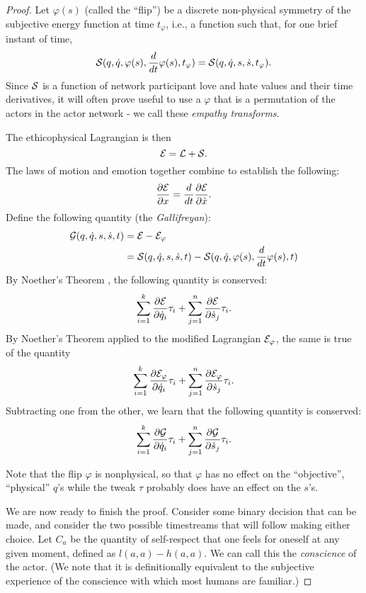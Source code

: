 \documentclass{article}
\begin{document}
\begin{proof}
  Let $\varphi(s)$ (called the ``flip'') be a discrete non-physical
  symmetry of the subjective energy function at time $t_{\varphi}$,
  i.e., a function such that, for one brief instant of time,
  $${\mathcal S}(q, \dot{q}, \varphi(s), \frac{d}{dt} \varphi(s), t_{\varphi})
  = {\mathcal S}(q, \dot{q}, s, \dot{s}, t_{\varphi}).$$ Since ${\mathcal S}$ is a
  function of network participant love and hate values and their time
  derivatives, it will often prove useful to use a $\varphi$ that is a
  permutation of the actors in the actor network - we call these {\em
    empathy transforms}.

  The ethicophysical Lagrangian is then
  $${\mathcal E} = {\mathcal L} + {\mathcal S}.$$ The laws of motion and emotion together
  combine to establish the following:
  $$\frac{\partial {\mathcal E}}{\partial x} = \frac{d}{dt} \frac{\partial
    {\mathcal E}}{\partial \dot{x}}.$$
  Define the following quantity (the {\em Gallifreyan}):
  \begin{align*}
{\mathcal G}(q, \dot{q}, s, \dot{s}, t) &= {\mathcal E} - {\mathcal E}_\varphi\\
&= {\mathcal S}(q, \dot{q}, s, \dot{s}, t) - {\mathcal S}(q, \dot{q}, \varphi(s), \frac{d}{dt}\varphi(s), t)\\
\end{align*}
  By Noether's Theorem \cite{noether}, the following quantity is
  conserved:
  $$\sum_{i=1}^k \frac{\partial {\mathcal E}}{\partial \dot{q}_i} \tau_i +
  \sum_{j=1}^n \frac{\partial {\mathcal E}}{\partial \dot{s}_j} \tau_i.$$ By
  Noether's Theorem applied to the modified Lagrangian ${\mathcal E}_\varphi$,
  the same is true of the quantity
  $$\sum_{i=1}^k \frac{\partial {\mathcal E}_\varphi}{\partial \dot{q}_i}
  \tau_i + \sum_{j=1}^n \frac{\partial {\mathcal E}_\varphi}{\partial
    \dot{s}_j} \tau_i.$$ 
  Subtracting one from the other, we learn that the following quantity is conserved:
  $$\sum_{i=1}^k \frac{\partial {\mathcal G}}{\partial \dot{q}_i} \tau_i +
  \sum_{j=1}^n \frac{\partial {\mathcal G}}{\partial \dot{s}_j} \tau_i.$$
  
  Note that the flip $\varphi$ is nonphysical, so that $\varphi$ has
  no effect on the ``objective'', ``physical'' $q$'s while the tweak
  $\tau$ probably does have an effect on the $s$'s.
  
  We are now ready to finish the proof. Consider some binary decision
  that can be made, and consider the two possible timestreams that
  will follow making either choice. Let $C_a$ be the quantity of
  self-respect that one feels for oneself at any given moment, defined
  as $l(a, a) - h(a, a)$. We can call this the {\em
    conscience} of the actor. (We note that it is definitionally
  equivalent to the subjective experience of the conscience with which
  most humans are familiar.)


\end{proof}
\end{document}
